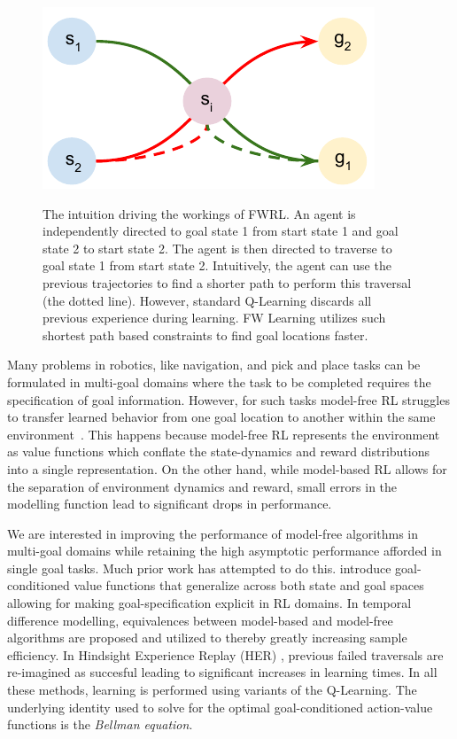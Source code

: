 \begin{figure}%
\includegraphics[width=\columnwidth]{./media/optimal_trajectories.pdf}\\
\caption{The intuition driving the workings of FWRL. An agent is
independently directed to goal state 1 from start state 1 and goal state
2 to start state 2. The agent is then directed to traverse to goal state
1 from start state 2. Intuitively, the agent can use the previous
trajectories to find a shorter path to perform this traversal (the
dotted line). However, standard Q-Learning discards all previous
experience during learning. FW Learning utilizes such shortest path
based constraints to find goal locations faster.  }
\label{fig:ql-fw-grid-world-results}%
\end{figure}

Many problems in robotics, like navigation, and  pick and place tasks can be
formulated in multi-goal domains where the task to be completed requires the
specification of goal information. However, for such tasks model-free RL struggles
to transfer learned behavior from one goal location to another within the same
environment~\citep{dhiman2018critical}. This happens because model-free RL represents the environment as
value functions which conflate the state-dynamics and reward distributions into
a single representation.
On the other hand, while model-based RL allows for the separation of environment
dynamics and reward, small errors in the modelling function lead to significant
drops in performance.

We are interested in improving the performance of model-free algorithms
in multi-goal domains while retaining the high asymptotic performance
afforded in single goal tasks. Much prior work has attempted to do this.
\citet{schaul2015universal} introduce goal-conditioned value functions
that generalize across both state and goal spaces allowing for making
goal-specification explicit in RL domains. In temporal difference
modelling, equivalences between model-based and model-free algorithms
are proposed and utilized to thereby greatly increasing sample
efficiency. In Hindsight Experience Replay (HER)
\cite{anderson2017vision}, previous failed traversals are re-imagined as
succesful leading to significant increases in learning times. In all
these methods, learning is performed using variants of the Q-Learning.
The underlying identity used to solve for the optimal goal-conditioned
action-value functions is the \emph{Bellman equation}. 

